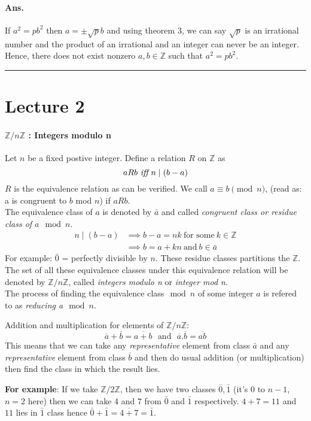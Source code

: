 \documentclass[12pt]{report}
\begin{document}
\paragraph*{Ans.}If $a^2 = pb^2$ then $a = \pm \sqrt{p}b$ and using theorem 3, we can say $\sqrt{p}$ is an irrational number and the product of an irrational and an integer can never be an integer. Hence, there does not exist nonzero $a,b \in \mathbb{Z}$ such that $a^2 = pb^2$.
\hrule
\section*{Lecture 2}
\paragraph*{\textbf{$\mathbb{Z}/n \mathbb{Z}$} : Integers modulo n} Let $n$ be a fixed postive integer. Define a relation $R$ on $\mathbb{Z}$ as 
$$ aRb ~\text{{\em iff}}~ n \mid (b-a)$$ $R$ is the equivalence relation as can be verified. We call $a \equiv b \pmod n$, (read as: a is congruent to $b$ mod $n$) if $aRb$. \\
The equivalence class of $a$ is denoted by $\bar{a}$ and called {\em congruent class or residue class of $a \mod n$}.
\begin{align*}
    n\mid (b-a) &\implies b-a = nk~\text{for some}~k \in \mathbb{Z}\\
    &\implies b = a + kn ~\text{and}~ b \in \bar{a}
\end{align*}
For example: $\bar{0}$ = perfectly divisible by $n$. These residue classes partitions the $\mathbb{Z}$.\\
The set of all these equivalence classes under this equivalence relation will be denoted by $\mathbb{Z}/n\mathbb{Z}$, called {\em integers modulo n} or {\em integer mod n}.\\
The process of finding the equivalence class$\mod n$ of some integer $a$ is refered to as {\em reducing a$\mod n$}.

Addition and multiplication for elements of $\mathbb{Z}/n\mathbb{Z}$:
$$ \overline{a} + \overline{b} = \overline{a+b}~~~\text{and}~~~ \overline{a} . \overline{b} = \overline{ab}$$
This means that we can take any {\em representative} element from class $\bar{a}$ and any {\em representative} element from class $\bar{b}$ and then do usual addition (or multiplication) then find the class in which the result lies.

\textbf{For example}: If we take $\mathbb{Z}/2\mathbb{Z}$, then we have two classes $\bar{0}, \bar{1}$ (it's $0$ to $n-1$, $n=2$ here) then we can take $4$ and $7$ from $\bar{0}$ and $\bar{1}$ respectively. $4+7 = 11$ and $11$ lies in $\bar{1}$ class hence $\bar{0} + \bar{1} = \overline{4+7} = \bar{1}$.
\end{document}

